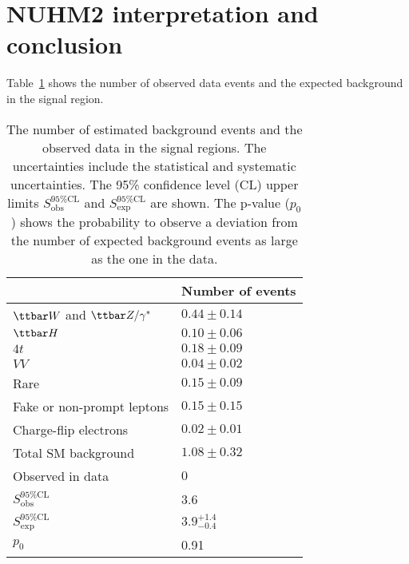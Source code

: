 \section{NUHM2 interpretation and conclusion}
\label{app:ss3l_NUHM2_interpretation_and_conclusion}
Table~\ref{tab:app_ss3l_SR_yields} shows the number of observed data events and the expected background in the signal region.
%
\begin{table}[htbp]
    \begin{center}
        {\scriptsize
            \begin{tabular}{ll}
                \hline
                \hline
                                                     & Number of events\\
                \hline
                $\ttbar W$ and $\ttbar Z/\gamma^{*}$ & $0.44 \pm 0.14$\\
                $\ttbar H$                           & $0.10 \pm 0.06$\\
                $4t$                                 & $0.18 \pm 0.09$\\
                $VV$                                 & $0.04 \pm 0.02$\\
                Rare                                 & $0.15 \pm 0.09$\\
                Fake or non-prompt leptons           & $0.15 \pm 0.15$\\
                Charge-flip electrons                & $0.02 \pm 0.01$\\
                Total SM background                  & $1.08 \pm 0.32$\\
                \hline
                Observed in data                     & $0$\\
                \hline
                $S_\mathrm{obs}^\mathrm{95\%CL}$     & 3.6\\
                $S_\mathrm{exp}^\mathrm{95\%CL}$     & $3.9^{+1.4}_{-0.4}$\\
                $p_{0}$                              & 0.91\\
                \hline
                \hline
            \end{tabular}
        }
    \end{center}
    \caption{The number of estimated background events and the observed data in the signal regions.
    The uncertainties include the statistical and systematic uncertainties.
    The 95\% confidence level (CL) upper limits $S_\mathrm{obs}^\mathrm{95\%CL}$ and $S_\mathrm{exp}^\mathrm{95\%CL}$ are shown.
    The p-value ($p_{0}$) shows the probability to observe a deviation from the number of expected background events as large as the one in the data.}
    \label{tab:app_ss3l_SR_yields}
\end{table}%
